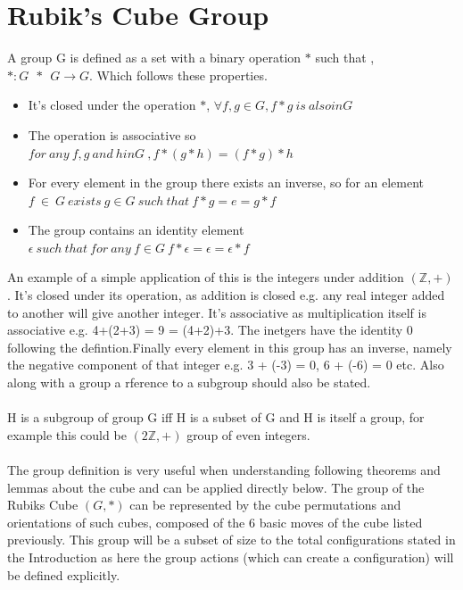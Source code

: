 \documentclass{article}
\begin{document}
\section{Rubik's Cube Group}
 
A group G is defined as a set with a binary operation $*$ such that , $* : G \ \ *\ \ G \rightarrow G$.
Which follows these properties.
\begin{itemize}
	\item It's closed under the operation $*$,  $\forall f, g \in G , f*g\ is\ also in G$
    \item The operation is associative so $for\ any\ f, g\ and\  h in  G\ ,  f*(g*h) = (f*g)*h$
    \item For every element in the group there exists an inverse, so for an element $ f\ \in\ G\ exists\ g \in G\ such\ that\ f*g=e=g*f$
    \item The group contains an identity element $\epsilon \ such\ that\ for\ any\ f \in G\ f*\epsilon=\epsilon=\epsilon *f$
\end{itemize}

An example of a simple application of this is the integers under addition $(\mathbb{Z},+)$. It's closed under its operation, as addition is closed e.g. any real integer added to another will give another integer. It's associative as multiplication itself is associative e.g. 4+(2+3) = 9 = (4+2)+3. The inetgers have the identity 0 following the defintion.Finally every element in this group has an inverse, namely the negative component of that integer e.g. 3 + (-3) = 0, 6 + (-6) = 0 etc. Also along with a group a rference to a subgroup should also be stated.\paragraph{}

H is a subgroup of  group G iff H is a subset of G and H is itself a group, for example this could be $(2\mathbb{Z},+)$ group of even integers.

\paragraph{}
The group definition is very useful when understanding following theorems and lemmas about the cube and can be applied directly below. The group of the Rubiks Cube $(G,*)$ can be represented by the cube permutations and orientations of such cubes, composed of the 6 basic moves of the cube listed previously.  This group will be a subset of size to the total configurations stated in the Introduction as here the group actions (which can create a configuration) will be defined explicitly.
\end{document}
